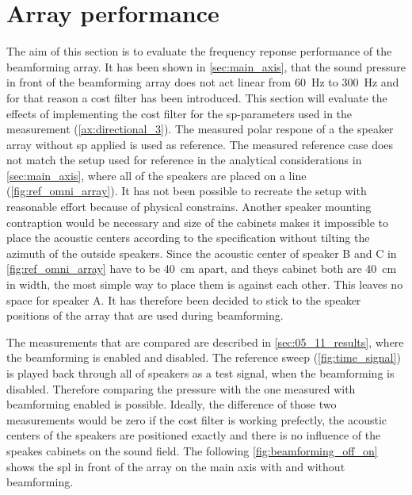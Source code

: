 \section{Array performance} \label{sec:beamforming_array_spl}

The aim of this section is to evaluate the frequency reponse performance of the beamforming array. It has been shown in \autoref{sec:main_axis}, that the sound pressure in front of the beamforming array does not act linear from \SI{60}{\hertz} to \SI{300}{\hertz} and for that reason a cost filter has been introduced. This section will evaluate the effects of implementing the cost filter for the \gls{sp}-parameters used in the measurement (\autoref{ax:directional_3}). The measured polar respone of a the speaker array without \gls{sp} applied is used as reference. 
The measured reference case does not match the setup used for reference in the analytical considerations in \autoref{sec:main_axis}, where all of the speakers are placed on a line (\autoref{fig:ref_omni_array}). It has not been possible to recreate the setup with reasonable effort because of physical constrains. Another speaker mounting contraption would be necessary and size of the cabinets makes it impossible to place the acoustic centers according to the specification without tilting the azimuth of the outside speakers. Since the acoustic center of speaker B and C in \autoref{fig:ref_omni_array} have to be \SI{40}{\centi\meter} apart, and theys cabinet both are \SI{40}{\centi\meter} in width, the most simple way to place them is against each other. This leaves no space for speaker A.
It has therefore been decided to stick to the speaker positions of the array that are used during beamforming.

The measurements that are compared are described in \autoref{sec:05_11_results}, where the beamforming is enabled and disabled. The reference sweep (\autoref{fig:time_signal}) is played back through all of speakers as a test signal, when the beamforming is disabled. Therefore comparing the pressure with the one measured with beamforming enabled is possible. Ideally, the difference of those two measurements would be zero if the cost filter is working prefectly, the acoustic centers of the speakers are positioned exactly and there is no influence of the speakes cabinets on the sound field. The following \autoref{fig:beamforming_off_on} shows the \gls{spl} in front of the array on the main axis with and without beamforming.

